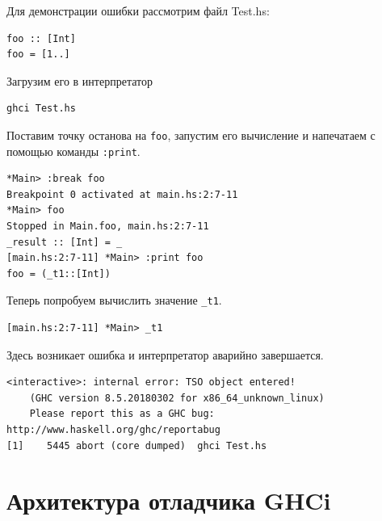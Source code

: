 \documentclass[fontsize=14pt, paper=a4, pagesize, DIV=calc]{scrartcl}
\def\code#1{\texttt{#1}}
\begin{document}
Для демонстрации ошибки рассмотрим файл Test.hs:

\begin{ListingEnv}
\caption{Test.hs}
\begin{lstlisting}
foo :: [Int]
foo = [1..]
\end{lstlisting}
\end{ListingEnv}

Загрузим его в интерпретатор

\begin{ListingEnv}
\caption{}
\begin{lstlisting}[numbers=none]
ghci Test.hs
\end{lstlisting}
\end{ListingEnv}

Поставим точку останова на \code{foo}, запустим его вычисление и
напечатаем с помощью команды \code{:print}.

\begin{ListingEnv}
\caption{}
\begin{lstlisting}[numbers=none]
*Main> :break foo
Breakpoint 0 activated at main.hs:2:7-11
*Main> foo
Stopped in Main.foo, main.hs:2:7-11
_result :: [Int] = _
[main.hs:2:7-11] *Main> :print foo
foo = (_t1::[Int])
\end{lstlisting}
\end{ListingEnv}

Теперь попробуем вычислить значение \code{\_t1}.

\begin{ListingEnv}
\caption{}
\begin{lstlisting}[numbers=none]
[main.hs:2:7-11] *Main> _t1
\end{lstlisting}
\end{ListingEnv}

Здесь возникает ошибка и интерпретатор аварийно завершается.

\begin{ListingEnv}
\caption{Ошибка}
\begin{lstlisting}[numbers=none]
<interactive>: internal error: TSO object entered!
    (GHC version 8.5.20180302 for x86_64_unknown_linux)
    Please report this as a GHC bug:  http://www.haskell.org/ghc/reportabug
[1]    5445 abort (core dumped)  ghci Test.hs
\end{lstlisting}
\end{ListingEnv}

\section{Архитектура отладчика GHCi}
\end{document}
